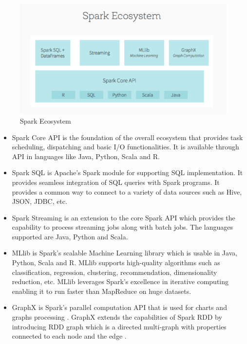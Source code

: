 \documentclass[sigconf]{acmart}
\begin{document}
\begin{figure}
\includegraphics[width=\columnwidth]{images/spark-ecosystem}
\caption{Spark Ecosystem \cite{img-echo}}
\label{Figure 2}
\end{figure}

\begin{itemize}

	\item Spark Core API is the foundation of the overall ecosystem that provides task scheduling, dispatching and basic I/O functionalities. It is available through API in languages like Java, Python, Scala and R.

  \item Spark SQL is Apache's Spark module for supporting SQL implementation. It provides seamless integration of SQL queries with Spark programs. It provides a common way to connect to a variety of data sources such as Hive, JSON, JDBC, etc.
  
  \item Spark Streaming is an extension to the core Spark API which provides the capability to process streaming jobs along with batch jobs. The languages supported are Java, Python and Scala.

  \item MLlib is Spark's scalable Machine Learning library which is usable in Java, Python, Scala and R. MLlib supports high-quality algorithms such as classification, regression, clustering, recommendation, dimensionality reduction, etc. MLlib leverages Spark's excellence in iterative computing enabling it to run faster than MapReduce on huge datasets.

  \item GraphX is Spark's parallel computation API that is used for charts and graphs processing \cite{fu2016spark-p1}. GraphX extends the capabilities of Spark RDD by introducing RDD graph which is a directed multi-graph with properties connected to each node and the edge \cite{spark-a1}. 
  
\end{itemize}
\end{document}

